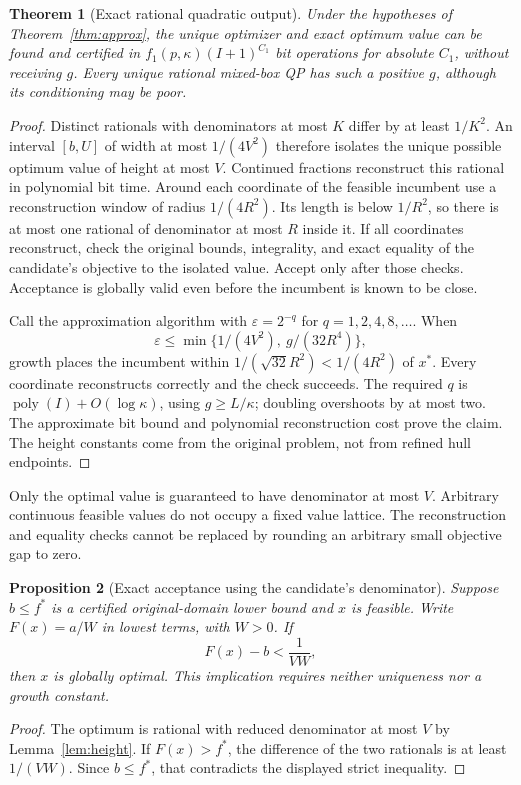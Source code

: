 \documentclass[11pt]{article}
\newtheorem{theorem}{Theorem}[section]
\newtheorem{proposition}[theorem]{Proposition}
\theoremstyle{remark}
\newcommand{\poly}{\operatorname{poly}}
\newcommand{\OPT}{f^*}
\begin{document}
\begin{theorem}[Exact rational quadratic output]\label{thm:exact}
Under the hypotheses of Theorem~\ref{thm:approx}, the unique optimizer
and exact optimum value can be found and certified in
$f_1(p,\kappa)(I+1)^{C_1}$ bit operations for absolute $C_1$, without
receiving $g$. Every unique rational mixed-box QP has such a positive
$g$, although its conditioning may be poor.
\end{theorem}
\begin{proof}
Distinct rationals with denominators at most $K$ differ by at least
$1/K^2$. An interval $[b,U]$ of width at most $1/(4V^2)$ therefore
isolates the unique possible optimum value of height at most $V$.
Continued fractions reconstruct this rational in polynomial bit time.
Around each coordinate of the feasible incumbent use a reconstruction
window of radius $1/(4R^2)$. Its length is below $1/R^2$, so there is
at most one rational of denominator at most $R$ inside it. If all
coordinates reconstruct, check the original bounds, integrality, and
exact equality of the candidate's objective to the isolated value.
Accept only after those checks. Acceptance is globally valid even before
the incumbent is known to be close.

Call the approximation algorithm with $\varepsilon=2^{-q}$ for
$q=1,2,4,8,\ldots$. When
\[
\varepsilon\le\min\{1/(4V^2),\ g/(32R^4)\},
\]
growth places the incumbent within $1/(\sqrt{32}R^2)<1/(4R^2)$ of
$x^*$. Every coordinate reconstructs correctly and the check succeeds.
The required $q$ is $\poly(I)+O(\log\kappa)$, using $g\ge L/\kappa$;
doubling overshoots by at most two. The approximate bit bound and
polynomial reconstruction cost prove the claim. The height constants
come from the original problem, not from refined hull endpoints.
\end{proof}

Only the optimal value is guaranteed to have denominator at most $V$.
Arbitrary continuous feasible values do not occupy a fixed value lattice.
The reconstruction and equality checks cannot be replaced by rounding
an arbitrary small objective gap to zero.

\begin{proposition}[Exact acceptance using the candidate's denominator]
\label{prop:candidateheight}
Suppose $b\le\OPT$ is a certified original-domain lower bound and $x$
is feasible. Write $F(x)=a/W$ in lowest terms, with $W>0$. If
\[
F(x)-b<\frac1{VW},
\]
then $x$ is globally optimal. This implication requires neither uniqueness
nor a growth constant.
\end{proposition}
\begin{proof}
The optimum is rational with reduced denominator at most $V$ by
Lemma~\ref{lem:height}. If $F(x)>\OPT$, the difference of the two
rationals is at least $1/(VW)$. Since $b\le\OPT$, that contradicts
the displayed strict inequality.
\end{proof}
\end{document}
